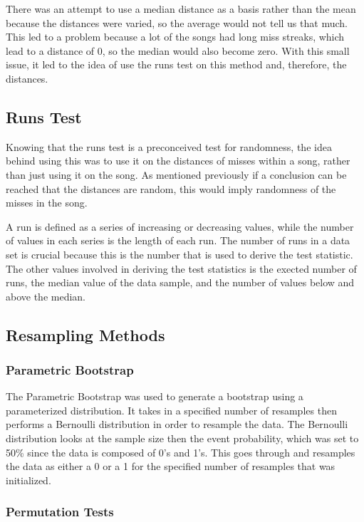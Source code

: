 \documentclass[12pt, letterpaper]{article}
\begin{document}
There was an attempt to use a median distance as a basis rather than the mean because the distances were varied, so the average would not tell us that much.  This led to a problem because a lot of the songs had long miss streaks, which lead to a distance of 0, so the median would also become zero.  With this small issue, it led to the idea of use the runs test on this method and, therefore, the distances.  

\subsection{Runs Test}
Knowing that the runs test is a preconceived test for randomness, the idea behind using this was to use it on the distances of misses within a song, rather than just using it on the song. As mentioned previously if a conclusion can be reached that the distances are random, this would imply randomness of the misses in the song. 

A run is defined as a series of increasing or decreasing values, while the number of values in each series is the length of each run. The number of runs in a data set is crucial because this is the number that is used to derive the test statistic. The other values involved in deriving the test statistics is the exected number of runs, the median value of the data sample, and the number of values below and above the median.

\subsection{Resampling Methods}
\subsubsection{Parametric Bootstrap}
The Parametric Bootstrap was used to generate a bootstrap using a parameterized distribution.  It takes in a specified number of resamples then performs a Bernoulli distribution in order to resample the data.  The Bernoulli distribution looks at the sample size then the event probability, which was set to 50\% since the data is composed of 0's and 1's.  This goes through and resamples the data as either a 0 or a 1 for the specified number of resamples that was initialized.   

\subsubsection{Permutation Tests}
\end{document}
